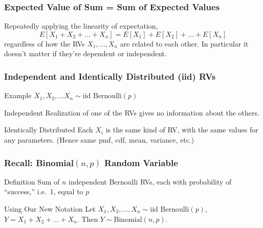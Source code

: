 
\begin{frame}
\frametitle{Expected Value of Sum = Sum of Expected Values}
Repeatedly applying the linearity of expectation,
$$E[X_1 + X_2 + \hdots + X_n] = E[X_1] + E[X_2] + \hdots + E[X_n]$$
regardless of how the RVs $X_1, \hdots, X_n$ are related to each other. In particular it \alert{doesn't matter if they're dependent or independent}.


\end{frame}
\begin{frame}
\frametitle{Independent and Identically Distributed (iid) RVs}

\begin{block}{Example}
	$X_1, X_2, \hdots X_n \sim \mbox{iid Bernoulli}(p)$
\end{block}

\begin{block}{Independent}
Realization of one of the RVs gives no information about the others.
\end{block}

\begin{block}{Identically Distributed}
Each $X_i$ is the same kind of RV, with the same values for any parameters. (Hence same pmf, cdf, mean, variance, etc.)
\end{block}

\end{frame}
\begin{frame}
\frametitle{Recall: Binomial$(n,p)$ Random Variable}

\begin{block}{Definition}
Sum of $n$ independent Bernoulli RVs, each with probability of ``success,'' i.e.\ 1, equal to $p$
\end{block}


\begin{alertblock}{Using Our New Notation}
Let $X_1, X_2, \hdots, X_n \sim \mbox{iid Bernoulli}(p)$, $Y = X_1 + X_2 + \hdots + X_n$. Then $Y \sim \mbox{Binomial}(n,p)$.
\end{alertblock}


\end{frame}
%
